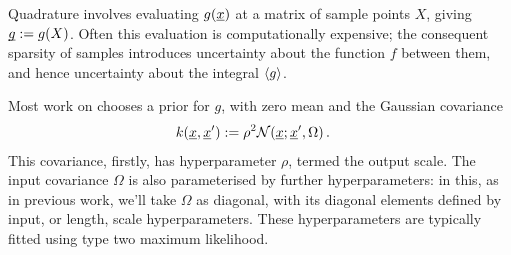 \documentclass[twoside]{article}
\begin{document}
Quadrature involves evaluating $g(\underline{\smash{x}})$ at a matrix of sample points $X$, giving $\underline{\smash{g}}:= g(X)$. Often this evaluation is computationally expensive; the consequent sparsity of samples introduces uncertainty about the function $f$ between them, and hence uncertainty about the integral $\langle g \rangle$.

Most work on \bq chooses a \gp prior for $g$, with zero mean and the Gaussian covariance 
\begin{align} \label{eq:Gaussian_cov_fn}
k(\underline{\smash{x}},\underline{\smash{x}}') & := \rho^2 \mathcal{N}(\underline{\smash{x}};\underline{\smash{x}}',\Omega)\,.
\end{align} 
This covariance, firstly, has hyperparameter $\rho$, 
termed the output scale. The input covariance $\Omega$ is also parameterised by further hyperparameters: in this, as in previous work, we'll take $\Omega$ as diagonal, with its diagonal elements defined by input, or length, scale hyperparameters.  These hyperparameters are typically fitted using type two maximum likelihood.
\end{document}
